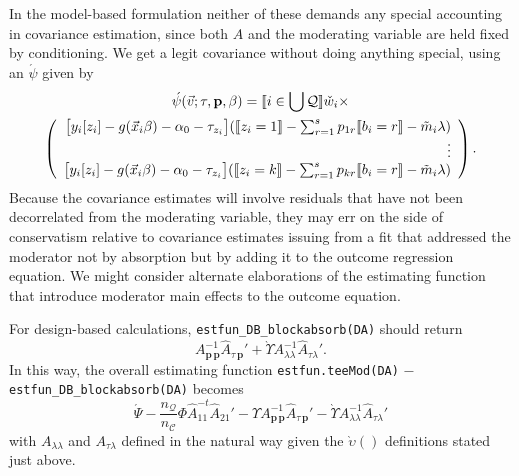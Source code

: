 \documentclass{article}
\DeclarePairedDelimiter{\indicator}{\llbracket}{\rrbracket}
\newcommand{\owt}[1][{[z_{i}]}]{\ensuremath{\check{w}_{i#1}}}
\newcommand{\AbsorbInterceptsEF}{\Upsilon}
\newcommand{\absorbModeratorEF}{\grave{\upsilon}}
\newcommand{\AbsorbModeratorEF}{\grave{\Upsilon}}
\begin{document}
In the model-based formulation neither of these demands any special
accounting in covariance estimation, since both $A$ and the moderating
variable are held fixed by conditioning. We get a legit covariance
without doing anything special, using an $\acute{\psi}$ given by
\begin{multline*}
  \acute{\psi}(\vec{v}; \tau, \mathbf{p}, \beta) =
    \indicator{i \in \bigcup \mathcal{Q}}\owt[] \times \\
\left(
  \begin{array}{r}
    \big[y_{i}[z_{i}]
    -
    g(\vec{x}_{i}\beta)-\alpha_{0}-\tau_{z_{i}}\big]
    (
    \indicator{z_{i}=1}-
    \sum_{r=1}^{s}p_{1r}\indicator{b_{i}=r}
    - \tilde{m}_{i}\lambda)\\
    \vdots \\
    {}\big[y_{i}[z_{i}]
    - g(\vec{x}_{i}\beta) -\alpha_{0} -
    \tau_{z_{i}}\big]
    (
    \indicator{z_{i}=k}
    -
    \sum_{r=1}^{s}p_{kr}\indicator{b_{i}=r}
    -
    \tilde{m}_{i}\lambda)\\
  \end{array}
\right) .
\end{multline*}
Because the covariance estimates will
involve residuals that have not been decorrelated from the moderating
variable, they may err on the side of conservatism relative to
covariance estimates issuing from a fit that addressed the moderator
not by absorption but by adding it to the outcome regression
equation. We might consider alternate elaborations of the estimating
function that introduce moderator main effects to the outcome equation.

For design-based calculations, \texttt{estfun\_DB\_blockabsorb(DA)}
 should return
 \begin{equation*}
   A_{\mathbf{p}\,\mathbf{p}}^{-1}\hat{A}_{\tau\,\mathbf{p}}' +
  \AbsorbModeratorEF{}A_{\lambda \lambda}^{-1}\hat{A}_{\tau \lambda}'.
 \end{equation*}
 In this way, the overall estimating function
 \texttt{estfun.teeMod(DA)} $-$ \texttt{estfun\_DB\_blockabsorb(DA)}
 becomes
 \begin{equation}
   \label{eq:19}
  \acute{\Psi} -
  \frac{n_{\mathcal{Q}}}{n_{\mathcal{C}}}\Phi
  \hat{A}_{11}^{-t}\hat{A}_{21}' - \AbsorbInterceptsEF{}
  A_{\mathbf{p}\,\mathbf{p}}^{-1}\hat{A}_{\tau\,\mathbf{p}}' -
  \AbsorbModeratorEF{}A_{\lambda \lambda}^{-1}\hat{A}_{\tau \lambda}'
 \end{equation}
with $A_{\lambda \lambda}$ and $A_{\tau \lambda}$ defined in the natural
way given the $\absorbModeratorEF()$ definitions stated just above.
\end{document}
